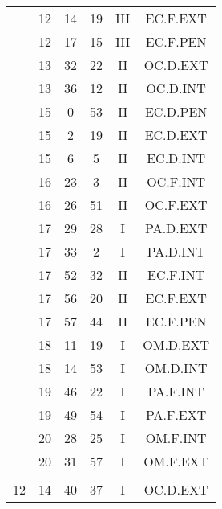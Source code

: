 \documentclass[12pt, a4paper]{article}
\begin{document}
\begin{multicols}{3}
{\begin{tabular}{c c c c c c}
	 	 	 	 & 12 & 14 & 19 & III & EC.F.EXT\\%
	 	 	 	 & 12 & 17 & 15 & III & EC.F.PEN\\%
	 	 	 	 & 13 & 32 & 22 & II & OC.D.EXT\\%
	 	 	 	 & 13 & 36 & 12 & II & OC.D.INT\\%
	 	 	 	 & 15 & 0 & 53 & II & EC.D.PEN\\%
	 	 	 	 & 15 & 2 & 19 & II & EC.D.EXT\\%
	 	 	 	 & 15 & 6 & 5 & II & EC.D.INT\\%
	 	 	 	 & 16 & 23 & 3 & II & OC.F.INT\\%
	 	 	 	 & 16 & 26 & 51 & II & OC.F.EXT\\%
	 	 	 	 & 17 & 29 & 28 & I & PA.D.EXT\\%
	 	 	 	 & 17 & 33 & 2 & I & PA.D.INT\\%
	 	 	 	 & 17 & 52 & 32 & II & EC.F.INT\\%
	 	 	 	 & 17 & 56 & 20 & II & EC.F.EXT\\%
	 	 	 	 & 17 & 57 & 44 & II & EC.F.PEN\\%
	 	 	 	 & 18 & 11 & 19 & I & OM.D.EXT\\%
	 	 	 	 & 18 & 14 & 53 & I & OM.D.INT\\%
	 	 	 	 & 19 & 46 & 22 & I & PA.F.INT\\%
	 	 	 	 & 19 & 49 & 54 & I & PA.F.EXT\\%
	 	 	 	 & 20 & 28 & 25 & I & OM.F.INT\\%
	 	 	 	 & 20 & 31 & 57 & I & OM.F.EXT\\%
	 	 	 	 & & & & & \\%
	 	 	 	12 & 14 & 40 & 37 & I & OC.D.EXT\\%
	 	 \end{tabular}
 	}
\end{multicols}
\end{document}
